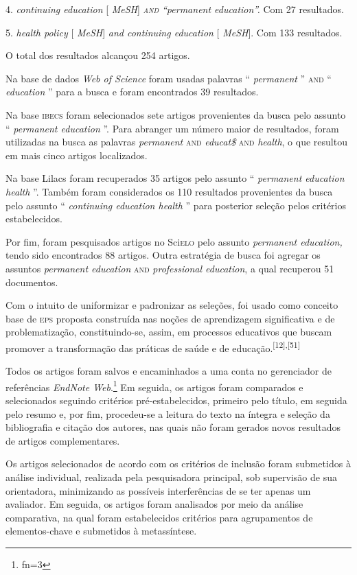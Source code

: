 \documentclass{article}
\makeatletter
\newcommand{\fn}{\afterassignment\fn@aux\count0=}
\newcommand{\fn@aux}{\csname fn\the\count0\endcsname}
\makeatother
\begin{document}
4. \textit{continuing education}
[ \textit{MeSH}] \textit{\textsc{and} “permanent education”.}
Com 27 resultados.

5. \textit{health policy}
[ \textit{MeSH}] \textit{and continuing education}
[ \textit{MeSH}]. Com 133 resultados.

O total dos resultados alcançou 254 artigos.

Na base de dados \textit{Web of Science}
foram usadas palavras “ \textit{permanent}
” \textsc{and} “ \textit{education}
” para a busca e foram encontrados 39 resultados.

Na base \textsc{ibecs} foram selecionados sete artigos provenientes da busca pelo assunto
“ \textit{permanent education}
”. Para abranger um número maior de resultados, foram utilizadas na busca as
palavras \textit{permanent}
\textsc{and} \textit{educat\$}
\textsc{and} \textit{health}, o que resultou em mais cinco artigos localizados.

Na base Lilacs foram recuperados 35 artigos pelo assunto “ \textit{permanent
education health}
”. Também foram considerados os 110 resultados provenientes da busca pelo
assunto “ \textit{continuing education health}
” para posterior seleção pelos critérios estabelecidos.

Por fim, foram pesquisados artigos no Sci\textsc{elo} pelo assunto \textit{permanent
education,}
tendo sido encontrados 88 artigos. Outra estratégia de busca foi agregar os
assuntos \textit{permanent education}
\textsc{and} \textit{professional education}, a qual recuperou 51 documentos.

Com o intuito de uniformizar e padronizar as seleções, foi usado como conceito
base de \textsc{eps} proposta construída nas noções de aprendizagem significativa e de
problematização, constituindo-se, assim, em processos educativos que buscam
promover a transformação das práticas de saúde e de educação.\textsuperscript{[}\textsuperscript{12}\textsuperscript{]}\textsuperscript{,}\textsuperscript{[}\textsuperscript{51}\textsuperscript{]}

Todos os artigos foram salvos e encaminhados a uma conta no gerenciador de
referências \textit{EndNote Web}.\footnote{\fn3}
Em seguida, os artigos foram comparados e selecionados seguindo critérios
pré-estabelecidos, primeiro pelo título, em seguida pelo resumo e, por fim,
procedeu-se a leitura do texto na íntegra e seleção da bibliografia e citação
dos autores, nas quais não foram gerados novos resultados de artigos
complementares.

Os artigos selecionados de acordo com os critérios de inclusão foram submetidos
à análise individual, realizada pela pesquisadora principal, sob supervisão de
sua orientadora, minimizando as possíveis interferências de se ter apenas um
avaliador. Em seguida, os artigos foram analisados por meio da análise
comparativa, na qual foram estabelecidos critérios para agrupamentos de
elementos-chave e submetidos à metassíntese.
\end{document}
